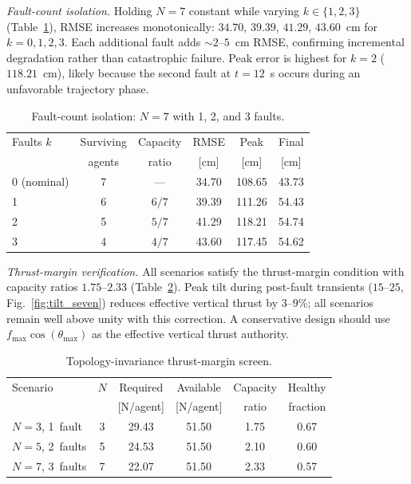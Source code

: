 \emph{Fault-count isolation.}\label{sec:fault_count_isolation}
Holding $N{=}7$ constant while varying $k \in \{1, 2, 3\}$ (Table~\ref{tab:fault_count_isolation}), RMSE increases monotonically: $34.70$, $39.39$, $41.29$, $43.60$~cm for $k = 0, 1, 2, 3$. Each additional fault adds ${\sim}2$--$5$~cm RMSE, confirming incremental degradation rather than catastrophic failure. Peak error is highest for $k{=}2$ ($118.21$~cm), likely because the second fault at $t{=}12$~s occurs during an unfavorable trajectory phase.

\begin{table}[t]
\centering
\caption{Fault-count isolation: $N{=}7$ with 1, 2, and 3 faults.}
\label{tab:fault_count_isolation}
\begin{tabular}{lccccc}
\toprule
Faults $k$ & Surviving & Capacity & RMSE & Peak & Final \\
           & agents    & ratio    & [cm] & [cm] & [cm]  \\
\midrule
0 (nominal) & 7 & --- & 34.70 & 108.65 & 43.73 \\
1           & 6 & $6/7$ & 39.39 & 111.26 & 54.43 \\
2           & 5 & $5/7$ & 41.29 & 118.21 & 54.74 \\
3           & 4 & $4/7$ & 43.60 & 117.45 & 54.62 \\
\bottomrule
\end{tabular}
\end{table}

\emph{Thrust-margin verification.}
All scenarios satisfy the thrust-margin condition with capacity ratios $1.75$--$2.33$ (Table~\ref{tab:topology_margin}). Peak tilt during post-fault transients ($15$\textdegree--$25$\textdegree, Fig.~\ref{fig:tilt_seven}) reduces effective vertical thrust by $3$--$9\%$; all scenarios remain well above unity with this correction. A conservative design should use $f_{\max} \cos(\theta_{\max})$ as the effective vertical thrust authority.

\begin{table}[t]
\centering
\caption{Topology-invariance thrust-margin screen.}
\label{tab:topology_margin}
\begin{tabular}{lccccc}
\toprule
Scenario & $N$ & Required & Available & Capacity & Healthy \\
         &     & [N/agent]& [N/agent] & ratio    & fraction \\
\midrule
$N{=}3$, 1~fault & 3 & 29.43 & 51.50 & 1.75 & 0.67 \\
$N{=}5$, 2~faults & 5 & 24.53 & 51.50 & 2.10 & 0.60 \\
$N{=}7$, 3~faults & 7 & 22.07 & 51.50 & 2.33 & 0.57 \\
\bottomrule
\end{tabular}
\end{table}

